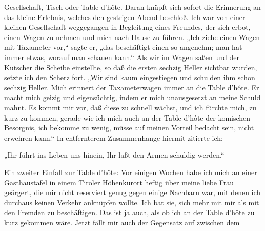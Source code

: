 \documentclass[twoside=true,titlepage=false,open=any, parskip=never, fontsize=10pt, headings=small, chapterprefix=false, appendixprefix=false]{scrbook}
\begin{document}
            
        \pstart
        Gesellschaft, Tisch oder Table d’hôte. Daran
               knüpft sich sofort die Erinnerung an das kleine Erlebnis, welches den
               gestrigen Abend beschloß. Ich war von einer kleinen Gesellschaft weggegangen in
               Begleitung eines Freundes, der sich erbot, einen Wagen zu nehmen und mich nach
               Hause zu führen. „Ich ziehe einen Wagen mit Taxameter vor,“ sagte er, „das
               beschäftigt einen so angenehm; man hat immer etwas, worauf man schauen
               kann.“ Als wir im Wagen saßen und der Kutscher die Scheibe einstellte, so daß
               die ersten sechzig Heller sichtbar wurden, setzte ich den Scherz fort. „Wir sind
               kaum eingestiegen und schulden ihm schon sechzig Heller. Mich erinnert der
               Taxameterwagen immer an die Table d’hôte. Er
               macht mich geizig und eigensüchtig, indem er mich unausgesetzt an
               meine Schuld mahnt. Es kommt mir vor, daß diese zu schnell wächst, und ich
               fürchte mich, zu kurz zu kommen, gerade wie ich mich auch an der
               Table d’hôte der komischen Besorgnis, ich bekomme zu
               wenig, müsse auf meinen Vorteil bedacht sein, nicht erwehren kann.“ In
               entfernterem Zusammenhange hiermit zitierte ich:
        \pend
    
            
        \pstart
        „Ihr führt ins Leben uns hinein,
                  Ihr laßt den Armen schuldig werden.“
        \pend
    
            
        \pstart
        Ein zweiter Einfall zur Table d’hôte: Vor einigen Wochen habe ich mich an einer
                  Gasthaustafel in einem Tiroler Höhenkurort
               heftig über meine liebe Frau geärgert, die mir nicht reserviert genug gegen
               einige Nachbarn war, mit denen ich durchaus keinen Verkehr anknüpfen
               wollte. Ich bat sie, sich mehr mit mir als mit den Fremden zu beschäftigen. Das
               ist ja auch, als ob ich an der Table d’hôte zu kurz
                  gekommen wäre. Jetzt fällt mir auch der Gegensatz auf zwischen dem
        \pend
    
         
            
            
            
\end{document}
